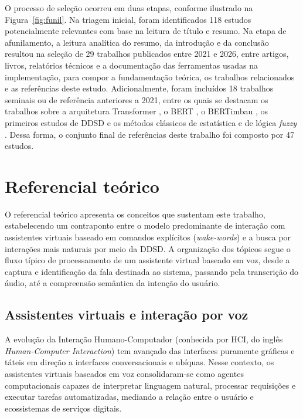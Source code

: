 \documentclass[
    12pt,                %
    openright,           %
    oneside,             %
    a4paper,             %
    english,             %
    brazil               %
]{abntex2}
\begin{document}
O processo de seleção ocorreu em duas etapas, conforme ilustrado na Figura~\ref{fig:funil}. Na triagem inicial, foram identificados 118 estudos potencialmente relevantes com base na leitura de título e resumo. Na etapa de afunilamento, a leitura analítica do resumo, da introdução e da conclusão resultou na seleção de 29 trabalhos publicados entre 2021 e 2026, entre artigos, livros, relatórios técnicos e a documentação das ferramentas usadas na implementação, para compor a fundamentação teórica, os trabalhos relacionados e as referências deste estudo. Adicionalmente, foram incluídos 18 trabalhos seminais ou de referência anteriores a 2021, entre os quais se destacam os trabalhos sobre a arquitetura Transformer \cite{Vaswani2017}, o BERT \cite{Devlin2019}, o BERTimbau \cite{Souza2020}, os primeiros estudos de DDSD \cite{Mallidi2018, Norouzian2019} e os métodos clássicos de estatística e de lógica \textit{fuzzy} \cite{Spearman1904, Cohen1960, Efron1979, Zadeh1965, Mamdani1975}. Dessa forma, o conjunto final de referências deste trabalho foi composto por 47 estudos.

\section{Referencial teórico}
\label{sec:referencial}

O referencial teórico apresenta os conceitos que sustentam este trabalho, estabelecendo um contraponto entre o modelo predominante de interação com assistentes virtuais baseado em comandos explícitos (\textit{wake-words}) e a busca por interações mais naturais por meio da DDSD. A organização dos tópicos segue o fluxo típico de processamento de um assistente virtual baseado em voz, desde a captura e identificação da fala destinada ao sistema, passando pela transcrição do áudio, até a compreensão semântica da intenção do usuário.


\subsection{Assistentes virtuais e interação por voz}

A evolução da Interação Humano-Computador (conhecida por HCI, do inglês \textit{Human-Computer Interaction}) tem avançado das interfaces puramente gráficas e táteis em direção a interfaces conversacionais e ubíquas. Nesse contexto, os assistentes virtuais baseados em voz consolidaram-se como agentes computacionais capazes de interpretar linguagem natural, processar requisições e executar tarefas automatizadas, mediando a relação entre o usuário e ecossistemas de serviços digitais.
\end{document}
